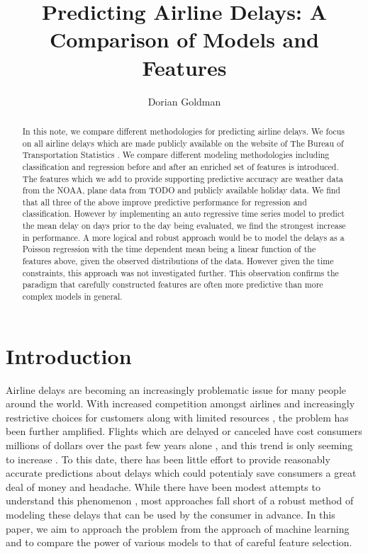 \documentclass[twocolumn,showpacs,%
  nofootinbib,aps,superscriptaddress,%
  eqsecnum,prd,notitlepage,showkeys,10pt]{revtex4-1}
\begin{document}
\title{Predicting Airline Delays: A Comparison of Models and Features}
\author{Dorian Goldman}

\begin{abstract}
In this note, we compare different methodologies for predicting airline delays. We focus on all airline delays which are made publicly available on the website of
The Bureau of Transportation Statistics \cite{}. We compare different modeling methodologies including classification and regression before and after an enriched set of features
is introduced. The features which we add to provide supporting predictive accuracy are weather data from the NOAA, plane data from TODO and publicly available holiday data. We find
that all three of the above improve predictive performance for regression and classification. However by implementing an auto regressive time series model to predict the mean delay on days prior 
to the day being evaluated, we find the strongest increase in performance. A more logical  and robust approach would be to model the delays as a Poisson regression with the time dependent mean being a linear function of the features above, given the observed
distributions of the data. However given the time constraints, this approach was not investigated further.  This observation confirms the paradigm that carefully constructed features are often more predictive than more complex models in general.
\end{abstract}

\maketitle

\section{Introduction}

Airline delays are becoming an increasingly problematic issue for many people around the world. With increased competition amongst airlines \cite{} and increasingly restrictive choices for customers \cite{} along with limited resources
\cite{}, the problem has been further amplified. Flights which are delayed or canceled have cost consumers millions of dollars over the past few years alone \cite{}, and this trend is only seeming to increase \cite{}. To this date, there has been little effort to provide reasonably accurate predictions about delays which could potentialy save consumers a great deal of money and headache. While there have been modest attempts to understand this phenomenon \cite{}, most approaches fall short of a robust
method of modeling these delays that can be used by the consumer in advance. In this paper, we aim to approach the problem from the approach of machine learning and to compare the power of various models to that of careful feature selection. 
\end{document}
